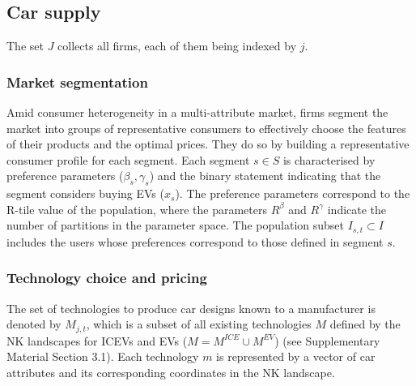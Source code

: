 \documentclass[12pt]{article}
\begin{document}
	\subsection{Car supply}
	The set $J$ collects all firms, each of them being indexed by $j$.
    
	\subsubsection{Market segmentation}\label{Supply:Segmentation}
	Amid consumer heterogeneity in a multi-attribute market, firms segment the market into groups of representative consumers to effectively choose the features of their products and the optimal prices. They do so by building a representative consumer profile for each segment. Each segment $s\in{S}$ is characterised by preference parameters ($\beta_s,\gamma_s$) and the binary statement indicating that the segment considers buying EVs ($x_s$). The preference parameters correspond to the R-tile value of the population, where the parameters $R^\beta$ and $R^\gamma$ indicate the number of partitions in the parameter space. The population subset $I_{s,t}\subset{I}$ includes the users whose preferences correspond to those defined in segment $s$.  
	
	\subsubsection{Technology choice and pricing}\label{Supply:Choice_Pricing}
	The set of technologies to produce car designs known to a manufacturer is denoted by $M_{j,t}$, which is a subset of all existing technologies $M$ defined by the NK landscapes for ICEVs and EVs ($M=M^{ICE}\cup{M^{EV}}$) (see Supplementary Material Section 3.1). Each technology $m$ is represented by a vector of car attributes and its corresponding coordinates in the NK landscape.
	
\end{document}
